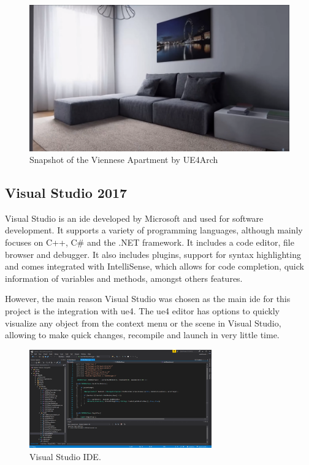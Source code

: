 \begin{figure}[h]
	\includegraphics[scale=0.2]{archivos/london_apartment.png}
	\centering
	\caption[Snapshot of the Viennese Apartment by UE4Arch]{Snapshot of the Viennese Apartment by UE4Arch\footnotemark}
	\label{fig:london_apartment}
\end{figure}

\subsection{Visual Studio 2017}
Visual Studio is an \gls{ide} developed by Microsoft and used for software development. It supports a variety of programming languages, although mainly focuses on C++, C\# and the .NET framework. It includes a code editor, file browser and debugger. It also includes plugins, support for syntax highlighting and comes integrated with IntelliSense, which allows for code completion, quick information of variables and methods, amongst others features.

However, the main reason Visual Studio was chosen as the main \gls{ide} for this project is the integration with \gls{ue4}. The \gls{ue4} editor has options to quickly visualize any object from the context menu or the scene in Visual Studio, allowing to make quick changes, recompile and launch in very little time.

\begin{figure}[h]
	\includegraphics[width=0.7\textwidth]{archivos/vs_ide.png}
	\centering
	\caption{Visual Studio IDE.}
	\label{fig:visual_studio}
\end{figure}

